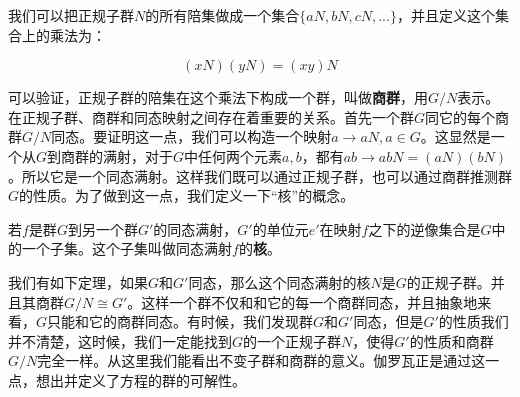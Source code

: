 \documentclass[b5paper]{ctexart}
\begin{document}
我们可以把正规子群$N$的所有陪集做成一个集合$\{aN, bN, cN, ...\}$，并且定义这个集合上的乘法为：

\[
(xN)(yN) = (xy)N
\]

可以验证，正规子群的陪集在这个乘法下构成一个群，叫做\textbf{商群}，用$G/N$表示。在正规子群、商群和同态映射之间存在着重要的关系。首先一个群$G$同它的每个商群$G/N$同态。要证明这一点，我们可以构造一个映射$a \to aN, a \in G$。这显然是一个从$G$到商群的满射，对于$G$中任何两个元素$a, b$，都有$ab \to abN = (aN)(bN)$。所以它是一个同态满射。这样我们既可以通过正规子群，也可以通过商群推测群$G$的性质。为了做到这一点，我们定义一下“核”的概念。

\begin{definition}
若$f$是群$G$到另一个群$G'$的同态满射，$G'$的单位元$e'$在映射$f$之下的逆像集合是$G$中的一个子集。这个子集叫做同态满射$f$的\textbf{核}。
\end{definition}

我们有如下定理，如果$G$和$G'$同态，那么这个同态满射的核$N$是$G$的正规子群。并且其商群$G/N \cong G'$。这样一个群不仅和和它的每一个商群同态，并且抽象地来看，$G$只能和它的商群同态。有时候，我们发现群$G$和$G'$同态，但是$G'$的性质我们并不清楚，这时候，我们一定能找到$G$的一个正规子群$N$，使得$G'$的性质和商群$G/N$完全一样。从这里我们能看出不变子群和商群的意义。伽罗瓦正是通过这一点，想出并定义了方程的群的可解性。

\begin{Exercise}\label{ex:subgroup}
\end{Exercise}

\begin{Answer}[ref={ex:subgroup}]
\end{Answer}
\end{document}
